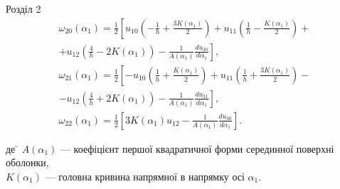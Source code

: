 \documentclass[8pt]{beamer}
\numberwithin{figure}{section}
\numberwithin{equation}{section}
\numberwithin{table}{section}
\begin{document}
\begin{frame}{Розділ 2}
\begin{equation}\label{eq:sqt_strain_ang}
\begin{aligned}
\omega_{20}\left(\alpha_1\right)=\frac12 
\left[
u_{10}
\left( -\frac{1}{h}+\frac{3K\left( \alpha_1 \right)}{2} \right)
+u_{11}\left( \frac{1}{h}-\frac{K\left( \alpha_1 \right)}{2} \right)+\right.\\
\left.
+u_{12}\left( \frac{4}{h}-2K\left( \alpha_1 \right) \right)
 - \frac{1}{A\left(\alpha_1\right)}\frac{du_{30}}{d\alpha_1}
\right],\\
\omega_{21}\left(\alpha_1\right)=\frac12 
\left[
-u_{10}
\left( \frac{1}{h}+\frac{K\left( \alpha_1 \right)}{2} \right)
+u_{11}\left( \frac{1}{h}+\frac{3K\left( \alpha_1 \right)}{2} \right)-\right.\\
\left.
-u_{12}\left( \frac{4}{h}+2K\left( \alpha_1 \right) \right)
 - \frac{1}{A\left(\alpha_1\right)}\frac{du_{31}}{d\alpha_1}
\right],\\
\omega_{22}\left(\alpha_1\right)=\frac12 
\left[3K\left( \alpha_1 \right)u_{12}
 - \frac{1}{A\left(\alpha_1\right)}\frac{du_{30}}{d\alpha_1}
\right].
\end{aligned}
\end{equation}

\begin{tabbing}
де \= $  A \left( \alpha_1 \right)$ --- коефіцієнт першої квадратичної форми серединної поверхні оболонки,\\
\> $K \left( \alpha_1 \right)$ --- головна кривина напрямної в напрямку осі $\alpha_1$.
\end{tabbing}

\end{frame}
\end{document}
